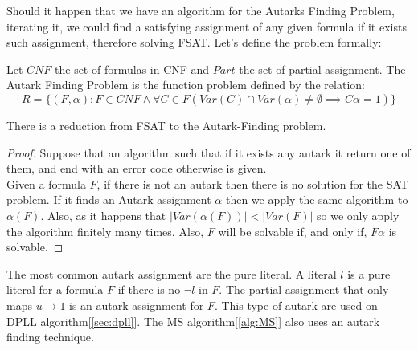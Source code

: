 Should it happen that we have an algorithm for the Autarks Finding Problem, iterating it, we could find a satisfying assignment of any given formula if it exists such assignment, therefore solving FSAT.  Let's define the problem formally:

\begin{definition}
  Let $CNF$ the set of formulas in CNF and $Part$ the set of partial assignment. The Autark Finding Problem is the function problem defined by the relation:
  $$R = \{(F,\alpha): F \in CNF\wedge \forall C \in F( Var(C)\cap Var(\alpha)\ne\emptyset \implies C\alpha=1 )\}$$
\end{definition}

\begin{proposition}
  There is a reduction from FSAT to the Autark-Finding problem.
\end{proposition}
\begin{proof} Suppose that an algorithm such that if it exists any autark it return one of them, and end with an error code otherwise is given.  \\

    Given a formula $F$, if there is not an autark then there is no solution for the SAT problem. If it finds an Autark-assignment $\alpha$ then we apply the same algorithm to $\alpha(F)$. Also, as it happens that $|Var(\alpha(F))|<|Var(F)|$ so we only apply the algorithm finitely many times. Also, $F$ will be solvable if, and only if, $F\alpha$ is solvable.
\end{proof}


The most common autark assignment are the pure literal. A literal $l$ is a pure literal for a formula $F$ if there is no $\neg l$ in $F$. The partial-assignment that only maps $u\to 1$ is an autark assignment for $F$. This type of autark are used on DPLL algorithm[\ref{sec:dpll}]. The MS algorithm[\ref{alg:MS}] also uses an autark finding technique.